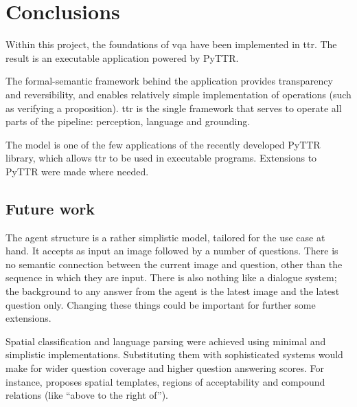 \renewcommand{\sectionautorefname}{Section}
\let\subsectionautorefname\sectionautorefname
\let\subsubsectionautorefname\sectionautorefname
\glsresetall
\section{Conclusions}
\label{sec:conclusions}

Within this project, the foundations of \gls{vqa} have been implemented in \gls{ttr}.
The result is an executable application powered by PyTTR.

The formal-semantic framework behind the application provides transparency and reversibility, and enables relatively simple implementation of operations (such as verifying a proposition).
\Gls{ttr} is the single framework that serves to operate all parts of the pipeline: perception, language and grounding.

The model is one of the few applications of the recently developed PyTTR library, which allows \gls{ttr} to be used in executable programs.
Extensions to PyTTR were made where needed.



\subsection{Future work}

The agent structure is a rather simplistic model, tailored for the use case at hand.
It accepts as input an image followed by a number of questions.
There is no semantic connection between the current image and question, other than the sequence in which they are input.
There is also nothing like a dialogue system;
the background to any answer from the agent is the latest image and the latest question only.
Changing these things could be important for further some extensions.

Spatial classification and language parsing were achieved using minimal and simplistic implementations.
Substituting them with sophisticated systems would make for wider question coverage and higher question answering scores.
For instance, \cite{LoganComputationalAnalysisApprehension1996} proposes spatial templates, regions of acceptability and compound relations (like ``above to the right of'').

